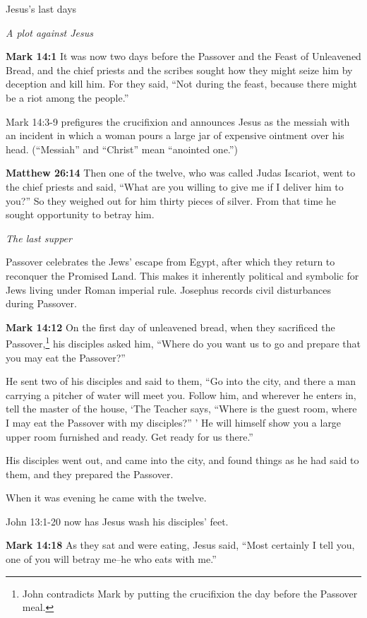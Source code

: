 \documentclass[10pt,twoside]{article} %
\newcommand{\quotesize}{\normalsize{}}
\newcommand{\comm}[1]{\begingroup \color{black!50} #1\endgroup}
\newenvironment{quotetext}{\begingroup\quotesize}{\endgroup}
\newcommand{\bible}[2]{\begin{quotetext}\textbf{#1} #2\end{quotetext}}
\newcommand{\matthew}[2]{\bible{Matthew #1}{#2}}
\newcommand{\gospelmark}[2]{\bible{Mark #1}{#2}}
\newcommand{\subhead}[1]{\emph{#1}\par}
\begin{document}
\begin{section}{Jesus's last days}

\subhead{A plot against Jesus}

\gospelmark{14:1}{
It was now two days before the Passover and the Feast of Unleavened Bread, and the chief priests and the scribes sought how they might seize him by deception and kill him.   For they said, ``Not during the feast, because there might be a riot among the people.''}

\comm{Mark 14:3-9 prefigures the crucifixion and announces Jesus as the messiah with an incident in which a woman pours a large jar of
expensive ointment over his head. (``Messiah'' and ``Christ'' mean ``anointed one.'')}

\matthew{26:14}{
Then one of the twelve, who was called Judas Iscariot, went to the chief priests   and said, ``What are you willing to give me if I deliver him to you?'' So they weighed out for him thirty pieces of silver.   From that time he sought opportunity to betray him.
}

\subhead{The last supper}

\comm{Passover celebrates the Jews' escape from Egypt, after which they return to reconquer the Promised Land. This makes it
inherently political and symbolic for Jews living under Roman imperial rule. Josephus records civil disturbances during Passover.}

\gospelmark{14:12}{
  On the first day of unleavened bread, when they sacrificed the Passover,\footnote{John contradicts Mark by putting the crucifixion the day before
the Passover meal.}
his disciples asked him, ``Where do you want us to go and prepare that you may eat the Passover?''

  He sent two of his disciples and said to them, ``Go into the city, and there a man carrying a pitcher of water will meet you. Follow him,    and wherever he enters in, tell the master of the house, `The Teacher says, ``Where is the guest room, where I may eat the Passover with my disciples?'' '    He will himself show you a large upper room furnished and ready. Get ready for us there.''

  His disciples went out, and came into the city, and found things as he had said to them, and they prepared the Passover. 

When it was evening he came with the twelve.
}

\comm{John 13:1-20 now has Jesus wash his disciples' feet.}

\gospelmark{14:18}{
     As they sat and were eating, Jesus said, ``Most certainly I tell you, one of you will betray me--he who eats with me.''

}
\end{section}
\end{document}
